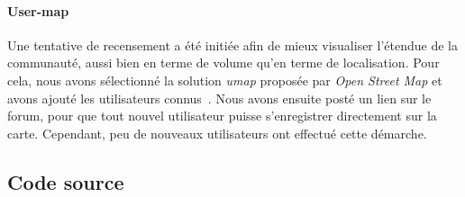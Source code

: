        \paragraph{User-map}\label{sec:map}
            Une tentative de recensement a été initiée afin de mieux visualiser l'étendue de la communauté, aussi bien en terme de volume qu'en terme de localisation. Pour cela, nous avons sélectionné la solution \textit{umap} proposée par \textit{Open Street Map} et avons ajouté les utilisateurs connus~. Nous avons ensuite posté un lien sur le forum, pour que tout nouvel utilisateur puisse s'enregistrer directement sur la carte. Cependant, peu de nouveaux utilisateurs ont effectué cette démarche.
    \subsection{Code source}\label{sec:code_source}
